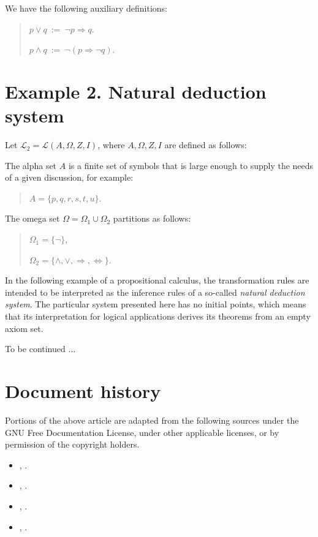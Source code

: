 \documentclass[12pt]{article}
\begin{document}
We have the following auxiliary definitions:

\begin{quote}
$p \lor q\ :=\ \lnot p \Rightarrow q$.

$p \land q\ :=\ \lnot(p \Rightarrow \lnot q)$.
\end{quote}

\section{Example 2.  Natural deduction system}

Let $\mathcal{L}_2 = \mathcal{L}(A, \Omega, Z, I)$, where $A, \Omega, Z, I$ are defined as follows:

The alpha set $A$ is a finite set of symbols that is large enough to supply the needs of a given discussion, for example:

\begin{quote}
$A = \{ p, q, r, s, t, u \}$.
\end{quote}

The omega set $\Omega = \Omega_1 \cup \Omega_2$ partitions as follows:

\begin{quote}
$\Omega_1 = \{ \lnot \}$,

$\Omega_2 = \{ \land, \lor, \Rightarrow, \Leftrightarrow \}$.
\end{quote}

In the following example of a propositional calculus, the transformation rules are intended to be interpreted as the inference rules of a so-called \textit{natural deduction system}.  The particular system presented here has no initial points, which means that its interpretation for logical applications derives its theorems from an empty axiom set.

To be continued $\ldots$

\section{Document history}

Portions of the above article are adapted from the following sources under the GNU Free Documentation License, under other applicable licenses, or by permission of the copyright holders.

\begin{itemize}
\item
{}, .
\item
{}, .
\item
{}, .
\item
{}, .
\end{itemize}

\end{document}
